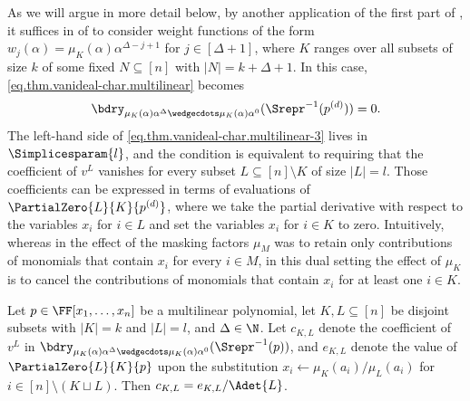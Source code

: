\documentclass{toc}
\begin{document}
As we will argue in more detail below, by another application of the first part of , it suffices in  of  to consider weight functions of the form $w_j(\alpha)=\mu_K(\alpha) \alpha^{\Delta-j+1}$ for $j \in [\Delta+1]$, where $K$ ranges over all subsets of size $k$ of some fixed $N \subseteq [n]$ with $|N|=k+\Delta+1$. In this case, \eqref{eq.thm.vanideal-char.multilinear} becomes
\begin{equation}\label{eq.thm.vanideal-char.multilinear-3}
\bdry_{\mu_K(\alpha)\alpha^{\Delta} \wedgecdots \mu_K(\alpha)\alpha^0}(  \Srepr^{-1}(p^{(d)}) ) = 0.
\end{equation}
The left-hand side of \eqref{eq.thm.vanideal-char.multilinear-3} lives in $\Simplicesparam{l}$, and the condition is equivalent to requiring that the coefficient of $v^L$ vanishes for every subset $L \subseteq [n]\setminus K$ of size $|L|=l$. Those coefficients can be expressed in terms of evaluations of $\PartialZero{L}{K}{p^{(d)}}$, where we take the partial derivative with respect to the variables $x_i$ for $i \in L$ and set the variables $x_i$ for $i \in K$ to zero. Intuitively, whereas in  the effect of the masking factors $\mu_M$ was to retain only contributions of monomials that contain $x_i$ for every $i \in M$, in this dual setting the effect of $\mu_K$ is to cancel the contributions of monomials that contain $x_i$ for at least one $i \in K$. 

\begin{proposition}
    \label{prop.ideal.membership.altalg}
    Let $p \in \FF[x_1,\dots,x_n]$ be a multilinear polynomial, let $K,L \subseteq [n]$ be disjoint subsets with $|K|=k$ and $|L|=l$, and $\Delta \in \N$. Let $c_{K,L}$ denote the coefficient of $v^L$ in $\bdry_{\mu_K(\alpha)\alpha^{\Delta} \wedgecdots \mu_K(\alpha)\alpha^0}(\Srepr^{-1}(p))$, and $e_{K,L}$ denote the value of $\PartialZero{L}{K}{p}$
    upon the substitution $x_i\gets \mu_K(a_i)/\mu_L(a_i)$ for $i \in [n]\setminus (K \sqcup L)$. Then $c_{K,L} = e_{K,L} / \Adet{L}$. 
\end{proposition}
\end{document}
